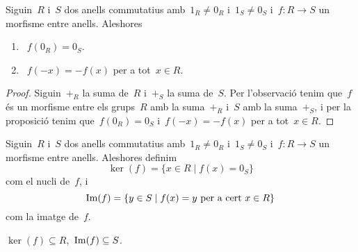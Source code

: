 \documentclass[../../Main.tex]{subfiles}
\begin{document}
	\begin{proposition}
		\label{prop:propietats morfismes entre anells}
			Siguin~\(R\) i~\(S\) dos anells commutatius amb~\(1_{R}\neq0_{R}\) i~\(1_{S}\neq0_{S}\) i~\(f\colon R\longrightarrow S\) un morfisme entre anells.
			Aleshores
		\begin{enumerate}
			\item~\(f(0_{R})=0_{S}\).
			\item~\(f(-x)=-f(x)\) per a tot~\(x\in R\).
		\end{enumerate}
		\begin{proof}
			Siguin~\(+_{R}\) la suma de~\(R\) i~\(+_{S}\) la suma de~\(S\).
			Per l'observació  tenim que~\(f\) és un morfisme entre els grups~\(R\) amb la suma~\(+_{R}\) i~\(S\) amb la suma~\(+_{S}\), i per la proposició  tenim que~\(f(0_{R})=0_{S}\) i~\(f(-x)=-f(x)\) per a tot~\(x\in R\).
		\end{proof}
	\end{proposition}
	\begin{definition}
		\label{def:nucli d'un morfisme entre anells}
		\label{def:imatge d'un morfisme entre anells}
		Siguin~\(R\) i~\(S\) dos anells commutatius amb~\(1_{R}\neq0_{R}\) i~\(1_{S}\neq0_{S}\) i~\(f\colon R\longrightarrow S\) un morfisme entre anells.
		Aleshores definim
		\[
		    \ker(f)=\{x\in R\mid f(x)=0_{S}\}
		\]
		com el nucli de~\(f\), i
		\[
		    \operatorname{Im}(f)=\{y\in S\mid f(x)=y\text{ per a cert }x\in R\}
		\]
		com la imatge de~\(f\).
	\end{definition}
	\begin{observation}
		\label{obs:nucli d'un morfisme entre anells es subconjunt del grup d'entrada, imatge n'és del de sortida}
		\(\ker(f)\subseteq R\),~\(\operatorname{Im}(f)\subseteq S\).
	\end{observation}
\end{document}
